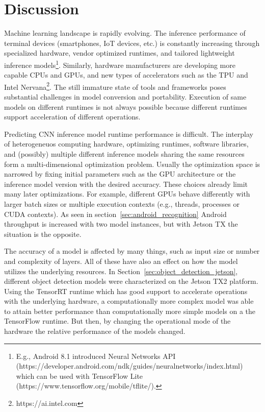 \documentclass[sigconf]{acmart}
\begin{document}
\section{Discussion}\label{sec:discussion}

Machine learning landscape is rapidly evolving. The inference performance of terminal devices (smartphones, IoT devices, etc.) is constantly increasing through specialized hardware, vendor optimized runtimes, and tailored lightweight inference models\footnote{E.g., Android 8.1 introduced Neural Networks API (https://developer.android.com/ndk/guides/neuralnetworks/index.html) which can be used with TensorFlow Lite (https://www.tensorflow.org/mobile/tflite/).}. Similarly, hardware manufacturers are developing more capable CPUs and GPUs, and new types of accelerators such as the TPU and Intel Nervana\footnote{https://ai.intel.com}.
The still immature state of tools and frameworks poses substantial challenges in model conversion and portability. Execution of same models on different runtimes is not always possible because different runtimes support acceleration of different operations.

Predicting CNN inference model runtime performance is difficult. The interplay of heterogeneuos computing hardware, optimizing runtimes, software libraries, and (possibly) multiple different inference models sharing the same resources form a multi-dimensional optimization problem.
Usually the optimization space is narrowed by fixing initial parameters such as the GPU architecture or the inference model version with the desired accuracy. These choices already limit many later optimizations. For example, different GPUs behave differently with larger batch sizes or multiple execution contexts (e.g., threads, processes or CUDA contexts). As seen in section~\ref{sec:android_recognition}
Android throughput is increased with two model instances, but with Jetson TX the situation is the opposite.

The accuracy of a model is affected by many things, such as input size or number and complexity of layers. All of these have also an effect on how the model utilizes the underlying resources. In Section~\ref{sec:object_detection_jetson}, different object detection models were characterized on the Jetson TX2 platform. Using the TensorRT runtime which has good support to accelerate operations with the underlying hardware, a computationally more complex model was able to attain better performance than computationally more simple models on a the TensorFlow runtime. But then, by changing the operational mode of the hardware the relative performance of the models changed.
\end{document}
